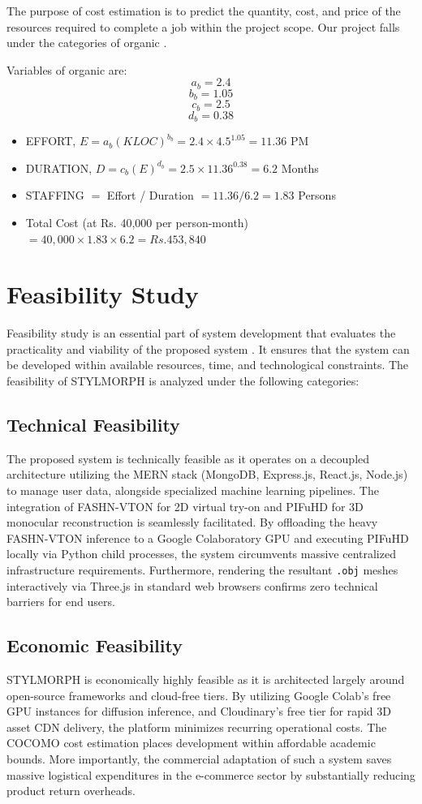 \documentclass[12pt,a4paper,oneside]{report}
\begin{document}
The purpose of cost estimation is to predict the quantity, cost, and price of the resources required to complete a job within the project scope. Our project falls under the categories of organic \cite{19}.

Variables of organic are:
\[a_b = 2.4\]
\[b_b = 1.05\]
\[c_b = 2.5\]
\[d_b = 0.38\]

\begin{itemize}
    \item EFFORT, \(E = a_b(KLOC)^{b_b} = 2.4 \times 4.5^{1.05} = 11.36\) PM
    \item DURATION, \(D = c_b(E)^{d_b} = 2.5 \times 11.36^{0.38} = 6.2\) Months
    \item STAFFING \(=\) Effort / Duration \(= 11.36 / 6.2 = 1.83\) Persons
    \item Total Cost (at Rs. 40,000 per person-month) \(= 40,000 \times 1.83 \times 6.2 = Rs. 453,840\)
\end{itemize}
\section{Feasibility Study}

Feasibility study is an essential part of system development that evaluates the practicality and viability of the proposed system \cite{19}. It ensures that the system can be developed within available resources, time, and technological constraints. The feasibility of STYLMORPH is analyzed under the following categories:

\subsection{Technical Feasibility}
The proposed system is technically feasible as it operates on a decoupled architecture utilizing the MERN stack (MongoDB, Express.js, React.js, Node.js) \cite{19} to manage user data, alongside specialized machine learning pipelines. The integration of FASHN-VTON \cite{16} for 2D virtual try-on and PIFuHD \cite{1} for 3D monocular reconstruction is seamlessly facilitated. By offloading the heavy FASHN-VTON inference to a Google Colaboratory GPU and executing PIFuHD locally via Python child processes, the system circumvents massive centralized infrastructure requirements. Furthermore, rendering the resultant \texttt{.obj} meshes interactively via Three.js \cite{6} in standard web browsers confirms zero technical barriers for end users.

\subsection{Economic Feasibility}
STYLMORPH is economically highly feasible as it is architected largely around open-source frameworks and cloud-free tiers. By utilizing Google Colab's free GPU instances for diffusion inference, and Cloudinary's free tier for rapid 3D asset CDN delivery, the platform minimizes recurring operational costs. The COCOMO cost estimation \cite{19} places development within affordable academic bounds. More importantly, the commercial adaptation of such a system saves massive logistical expenditures in the e-commerce sector by substantially reducing product return overheads.
\end{document}
